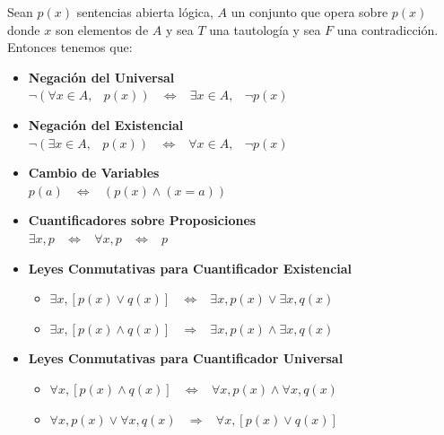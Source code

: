 \documentclass[12pt, fleqn]{report}                             %
\DeclareMathOperator \Space     {\quad}                         %
\DeclareMathOperator \MiniSpace {\;}                            %
\theoremstyle{break}                                            %
\newcommand \lEqual  {\MiniSpace \Leftrightarrow \MiniSpace}    %
\newcommand \lInfire {\MiniSpace \Rightarrow \MiniSpace}        %
\begin{document}
                Sean $p(x)$ sentencias abierta lógica, $A$ un conjunto que opera sobre $p(x)$ donde $x$ son
                elementos de $A$ y sea $T$ una tautología y sea $F$ una contradicción.
                Entonces tenemos que:

                \begin{itemize}
                    \item
                    \textbf{Negación del Universal} \\
                    $\lnot (\forall x \in A,\MiniSpace p(x)) \lEqual \exists x \in A,\MiniSpace \lnot p(x)$

                    \item
                    \textbf{Negación del Existencial} \\
                    $\lnot (\exists x \in A,\MiniSpace p(x)) \lEqual \forall x \in A,\MiniSpace \lnot p(x)$

                    \item \textbf{Cambio de Variables} \\
                            $p(a) \lEqual (p(x) \land (x=a))$
                            
                    \item \textbf{Cuantificadores sobre Proposiciones} \\
                            $\exists x, p \lEqual \forall x, p \lEqual p$

                    \item \textbf{Leyes Conmutativas para Cuantificador Existencial}

                        \begin{itemize}

                            \item
                            $\exists x, [p(x) \lor q(x)] \lEqual \exists x, p(x) \lor \exists x, q(x)$

                            \item
                            $\exists x, [p(x) \land q(x)] \lInfire \exists x, p(x) \land \exists x, q(x)$

                        \end{itemize}

                    \item \textbf{Leyes Conmutativas para Cuantificador Universal}

                        \begin{itemize}
                            
                            \item
                            $\forall x, [p(x) \land q(x)] \lEqual \forall x, p(x) \land \forall x, q(x)$

                            \item
                            $\forall x, p(x) \lor \forall x, q(x) \lInfire \forall x, [p(x) \lor q(x)]$

                        \end{itemize}
                        
                \end{itemize}
\end{document}

